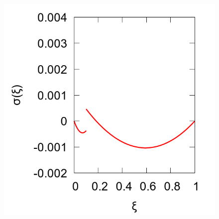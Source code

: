 \documentclass{beamer}
\begin{document}
\begin{frame}
\begin{overlayarea}{\textwidth}{\textheight}
\begin{figure}[!h]
{\begin{minipage}[b]{0.25\textwidth}
			\includegraphics[width=1\textwidth]{plots/sigma_q_0.4_alpha_0.125pi.png}
		\end{minipage}
		\label{fig:10.b}
	}
\end{figure}
\end{overlayarea}
\end{frame}
\end{document}
